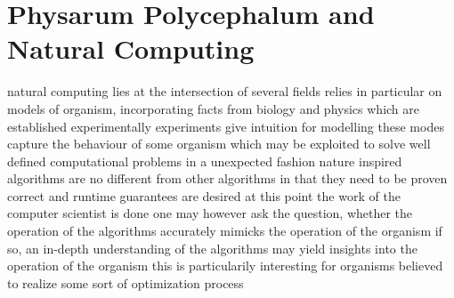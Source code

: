 \chapter{Physarum Polycephalum and Natural Computing}

natural computing lies at the intersection of several fields
relies in particular on models of organism, incorporating facts from biology and physics which are established experimentally
experiments give intuition for modelling
these modes capture the behaviour of some organism which may be exploited to solve well defined computational problems in a unexpected fashion
nature inspired algorithms are no different from other algorithms in that they need to be proven correct and runtime guarantees are desired
at this point the work of the computer scientist is done
one may however ask the question, whether the operation of the algorithms accurately mimicks the operation of the organism
if so, an in-depth understanding of the algorithms may yield insights into the operation of the organism
this is particularily interesting for organisms believed to realize some sort of optimization process







